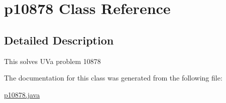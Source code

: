 \hypertarget{classp10878}{
\section{p10878 Class Reference}
\label{classp10878}
}


\subsection{Detailed Description}
This solves UVa problem 10878 

The documentation for this class was generated from the following file:\begin{DoxyCompactItemize}
\item 
\hyperlink{p10878_8java}{p10878.java}\end{DoxyCompactItemize}
